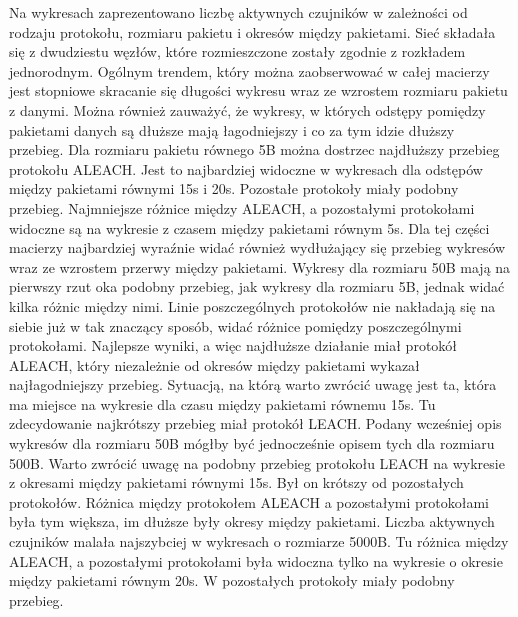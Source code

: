 
Na wykresach zaprezentowano liczbę aktywnych czujników w zależności od rodzaju protokołu, rozmiaru pakietu i okresów między pakietami. Sieć składała się z dwudziestu węzłów, które rozmieszczone zostały zgodnie z rozkładem jednorodnym.
Ogólnym trendem, który można zaobserwować w całej macierzy jest stopniowe skracanie się długości wykresu wraz ze wzrostem rozmiaru pakietu z danymi. Można również zauważyć, że wykresy, w których odstępy pomiędzy pakietami danych są dłuższe mają łagodniejszy i co za tym idzie dłuższy przebieg.
Dla rozmiaru pakietu równego 5B można dostrzec najdłuższy przebieg protokołu ALEACH. Jest to najbardziej widoczne w wykresach dla odstępów między pakietami równymi 15s i 20s. Pozostałe protokoły miały podobny przebieg. Najmniejsze różnice między ALEACH, a pozostałymi protokołami widoczne są na wykresie z czasem między pakietami równym 5s. Dla tej części macierzy najbardziej wyraźnie widać również wydłużający się przebieg wykresów wraz ze wzrostem przerwy między pakietami. 
Wykresy dla rozmiaru 50B mają na pierwszy rzut oka podobny przebieg, jak wykresy dla rozmiaru 5B, jednak widać kilka różnic między nimi. Linie poszczególnych protokołów nie nakładają się na siebie już w tak znaczący sposób, widać różnice pomiędzy poszczególnymi protokołami. Najlepsze wyniki, a więc najdłuższe działanie miał protokół ALEACH, który niezależnie od okresów między pakietami wykazał najłagodniejszy przebieg. Sytuacją, na którą warto zwrócić uwagę jest ta, która ma miejsce na wykresie dla czasu między pakietami równemu 15s. Tu zdecydowanie najkrótszy przebieg miał protokół LEACH. 
 Podany wcześniej opis wykresów dla rozmiaru 50B mógłby być jednocześnie opisem tych dla rozmiaru 500B. Warto zwrócić uwagę na podobny przebieg protokołu LEACH na wykresie z okresami między pakietami równymi 15s. Był on krótszy od pozostałych protokołów. Różnica między protokołem ALEACH a pozostałymi protokołami była tym większa, im dłuższe były okresy między pakietami. 
Liczba aktywnych czujników malała najszybciej w wykresach o rozmiarze 5000B. Tu różnica między ALEACH, a pozostałymi protokołami była widoczna tylko na wykresie o okresie między pakietami równym 20s. W pozostałych protokoły miały podobny przebieg. 


